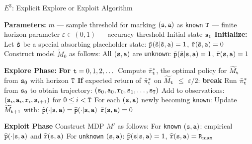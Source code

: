 \begin{algorithm}[H]
\caption{\texorpdfstring{$E^3$}{E3}: Explicit Explore or Exploit Algorithm}
\begin{algorithmic}[1]
\State \textbf{Parameters:}
\State \quad $m$ — sample threshold for marking $({\tt s}, {\tt a})$ as \texttt{known}
\State \quad ${\tt T}$ — finite horizon parameter
\State \quad $\varepsilon \in (0,1)$ — accuracy threshold
\State \quad Initial state ${\tt s}_0$
\vspace{1ex}
\State \textbf{Initialize:}
\State \quad Let $\tilde{{\tt s}}$ be a special absorbing placeholder state:
\State \quad \quad $\tilde{{\tt p}}(\tilde{{\tt s}}|\tilde{{\tt s}},{\tt a}) = 1$,
\quad $\tilde{{\tt r}}(\tilde{{\tt s}},{\tt a}) = 0$
\State \quad Construct model $\widetilde{M}_0$ as follows:
\State \quad \quad All $({\tt s},{\tt a})$ are \texttt{unknown}:
\State \quad \quad \quad $\tilde{{\tt p}}(\tilde{{\tt s}}|{\tt s},{\tt a}) = 1$,
\quad $\tilde{{\tt r}}({\tt s},{\tt a}) = 1$

\vspace{1ex}
\State \textbf{Explore Phase:}
\State \textbf{For} ${\tt t} = 0,1,2,\dots$
\State \quad Compute $\tilde{\pi}^*_{\tt t}$, the optimal policy for $\widetilde{M}_{\tt t}$ from ${\tt s}_0$ with horizon ${\tt T}$
\State \quad \textbf{If} expected return of $\tilde{\pi}^*_{\tt t}$ on $\widetilde{M}_{\tt t}$ $\leq$ $\varepsilon/2$: \textbf{break}
\State \quad Run $\tilde{\pi}^*_{\tt t}$ from ${\tt s}_0$ to obtain trajectory: $({\tt s}_0, {\tt a}_0, {\tt r}_0, {\tt s}_1, \ldots, {\tt s}_{\tt T})$
\State \quad Add to observations: $({\tt s}_i, {\tt a}_i, {\tt r}_i, {\tt s}_{i+1})$ for $0 \leq i < {\tt T}$
\State \quad For each $({\tt s},{\tt a})$ newly becoming \texttt{known}:
\State \quad \quad Update $\widetilde{M}_{{\tt t}+1}$ with:
\State \quad \quad \quad $\tilde{{\tt p}}(\cdot|{\tt s},{\tt a}) = \widehat{{\tt p}}(\cdot|{\tt s},{\tt a})$
\State \quad \quad \quad $\tilde{{\tt r}}({\tt s},{\tt a}) = 0$

\vspace{1ex}
\State \textbf{Exploit Phase}
\State \quad Construct MDP $M'$ as follows:
\State \quad \quad For \texttt{known} $({\tt s},{\tt a})$: empirical $\widehat{{\tt p}}(\cdot|{\tt s},{\tt a})$ and $\widehat{{\tt r}}({\tt s},{\tt a})$
\State \quad \quad For \texttt{unknown} $({\tt s},{\tt a})$: $\widehat{{\tt p}}({\tt s}|{\tt s},{\tt a}) = 1$, \quad $\widehat{{\tt r}}({\tt s},{\tt a}) = {\tt R}_{\max }$
\end{algorithmic}
\end{algorithm}


